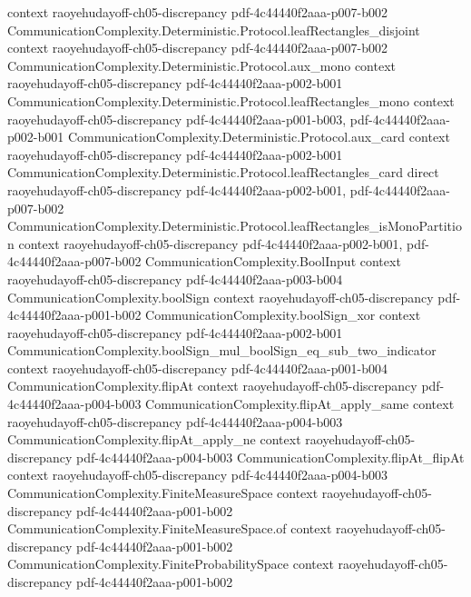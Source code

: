 \begin{theorem}
  {context}
  {raoyehudayoff-ch05-discrepancy}
  {pdf-4c44440f2aaa-p007-b002}
\proofstep
  {CommunicationComplexity.Deterministic.Protocol.leafRectangles_disjoint}
  {context}
  {raoyehudayoff-ch05-discrepancy}
  {pdf-4c44440f2aaa-p007-b002}
\proofstep
  {CommunicationComplexity.Deterministic.Protocol.aux_mono}
  {context}
  {raoyehudayoff-ch05-discrepancy}
  {pdf-4c44440f2aaa-p002-b001}
\proofstep
  {CommunicationComplexity.Deterministic.Protocol.leafRectangles_mono}
  {context}
  {raoyehudayoff-ch05-discrepancy}
  {pdf-4c44440f2aaa-p001-b003,
    pdf-4c44440f2aaa-p002-b001}
\proofstep
  {CommunicationComplexity.Deterministic.Protocol.aux_card}
  {context}
  {raoyehudayoff-ch05-discrepancy}
  {pdf-4c44440f2aaa-p002-b001}
\proofstep
  {CommunicationComplexity.Deterministic.Protocol.leafRectangles_card}
  {direct}
  {raoyehudayoff-ch05-discrepancy}
  {pdf-4c44440f2aaa-p002-b001,
    pdf-4c44440f2aaa-p007-b002}
\proofstep
  {CommunicationComplexity.Deterministic.Protocol.leafRectangles_isMonoPartition}
  {context}
  {raoyehudayoff-ch05-discrepancy}
  {pdf-4c44440f2aaa-p002-b001,
    pdf-4c44440f2aaa-p007-b002}
\proofstep
  {CommunicationComplexity.BoolInput}
  {context}
  {raoyehudayoff-ch05-discrepancy}
  {pdf-4c44440f2aaa-p003-b004}
\proofstep
  {CommunicationComplexity.boolSign}
  {context}
  {raoyehudayoff-ch05-discrepancy}
  {pdf-4c44440f2aaa-p001-b002}
\proofstep
  {CommunicationComplexity.boolSign_xor}
  {context}
  {raoyehudayoff-ch05-discrepancy}
  {pdf-4c44440f2aaa-p002-b001}
\proofstep
  {CommunicationComplexity.boolSign_mul_boolSign_eq_sub_two_indicator}
  {context}
  {raoyehudayoff-ch05-discrepancy}
  {pdf-4c44440f2aaa-p001-b004}
\proofstep
  {CommunicationComplexity.flipAt}
  {context}
  {raoyehudayoff-ch05-discrepancy}
  {pdf-4c44440f2aaa-p004-b003}
\proofstep
  {CommunicationComplexity.flipAt_apply_same}
  {context}
  {raoyehudayoff-ch05-discrepancy}
  {pdf-4c44440f2aaa-p004-b003}
\proofstep
  {CommunicationComplexity.flipAt_apply_ne}
  {context}
  {raoyehudayoff-ch05-discrepancy}
  {pdf-4c44440f2aaa-p004-b003}
\proofstep
  {CommunicationComplexity.flipAt_flipAt}
  {context}
  {raoyehudayoff-ch05-discrepancy}
  {pdf-4c44440f2aaa-p004-b003}
\proofstep
  {CommunicationComplexity.FiniteMeasureSpace}
  {context}
  {raoyehudayoff-ch05-discrepancy}
  {pdf-4c44440f2aaa-p001-b002}
\proofstep
  {CommunicationComplexity.FiniteMeasureSpace.of}
  {context}
  {raoyehudayoff-ch05-discrepancy}
  {pdf-4c44440f2aaa-p001-b002}
\proofstep
  {CommunicationComplexity.FiniteProbabilitySpace}
  {context}
  {raoyehudayoff-ch05-discrepancy}
  {pdf-4c44440f2aaa-p001-b002}

\end{theorem}
